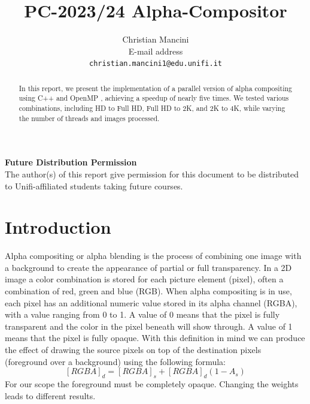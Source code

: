 \documentclass[10pt,twocolumn,letterpaper,english]{article}
\begin{document}
\title{PC-2023/24 Alpha-Compositor}

\author{Christian Mancini\\
E-mail address\\
{\tt\small christian.mancini1@edu.unifi.it}
}

\maketitle
\thispagestyle{empty}

\begin{abstract}
In this report, we present the implementation of a parallel version of alpha compositing using C++ and OpenMP \cite{openmp}, achieving a speedup of nearly five times. We tested various combinations, including HD to Full HD, Full HD to 2K, and 2K to 4K, while varying the number of threads and images processed.
\end{abstract}

\noindent\large\textbf{Future Distribution Permission}\\
\indent The author(s) of this report give permission for this document to be distributed to Unifi-affiliated students taking future courses.

\section{Introduction}

Alpha compositing or alpha blending is the process of combining one image with a background to create the appearance of partial or full transparency. In a 2D image a color combination is stored for each picture element (pixel), often a combination of red, green and blue (RGB). When alpha compositing is in use, each pixel has an additional numeric value stored in its alpha channel (RGBA), with a value ranging from 0 to 1. A value of 0 means that the pixel is fully transparent and the color in the pixel beneath will show through. A value of 1 means that the pixel is fully opaque. 
With this definition in mind we can produce the effect of drawing the
source pixels on top of the destination pixels (foreground over a background) using the following formula: 
\begin{equation}\label{eq:composting}
	[RGBA]_d = [RGBA]_s + [RGBA]_d(1-A_s)
\end{equation}
For our scope the foreground must be completely opaque. Changing the weights leads to different results. 
\end{document}
